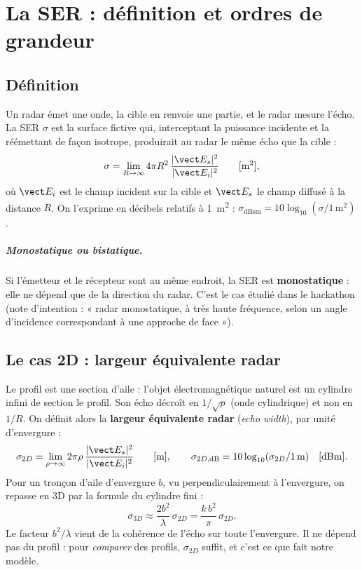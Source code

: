 \chapter{La SER : définition et ordres de grandeur}\label{ch:intro}

\section{Définition}
Un radar émet une onde, la cible en renvoie une partie, et le radar mesure l'écho. La SER $\sigma$ est la surface fictive qui, interceptant la puissance incidente et la réémettant de façon isotrope, produirait au radar le même écho que la cible :
\[
\sigma=\lim_{R\to\infty}4\pi R^2\,\frac{|\vect E_s|^2}{|\vect E_i|^2}\qquad[\mathrm{m}^2],
\]
où $\vect E_i$ est le champ incident sur la cible et $\vect E_s$ le champ diffusé à la distance $R$. On l'exprime en décibels relatifs à 1~m\textsuperscript{2} : $\sigma_{\mathrm{dBsm}}=10\log_{10}(\sigma/1\,\mathrm{m}^2)$.

\paragraph{Monostatique ou bistatique.} Si l'émetteur et le récepteur sont au même endroit, la SER est \textbf{monostatique} : elle ne dépend que de la direction du radar. C'est le cas étudié dans le hackathon (note d'intention : « radar monostatique, à très haute fréquence, selon un angle d'incidence correspondant à une approche de face »).

\section{Le cas 2D : largeur équivalente radar}
Le profil est une section d'aile : l'objet électromagnétique naturel est un cylindre infini de section le profil. Son écho décroît en $1/\sqrt\rho$ (onde cylindrique) et non en $1/R$. On définit alors la \textbf{largeur équivalente radar} (\emph{echo width}), par unité d'envergure :
\[
\sigma_{2D}=\lim_{\rho\to\infty}2\pi\rho\,\frac{|\vect E_s|^2}{|\vect E_i|^2}\qquad[\mathrm{m}],\qquad
\sigma_{2D,\mathrm{dB}}=10\log_{10}(\sigma_{2D}/1\,\mathrm{m})\quad[\mathrm{dBm}].
\]
Pour un tronçon d'aile d'envergure $b$, vu perpendiculairement à l'envergure, on repasse en 3D par la formule du cylindre fini :
\[
\sigma_{3D}\approx\frac{2b^2}{\lambda}\,\sigma_{2D}=\frac{k\,b^2}{\pi}\,\sigma_{2D}.
\]
Le facteur $b^2/\lambda$ vient de la cohérence de l'écho sur toute l'envergure. Il ne dépend pas du profil : pour \emph{comparer} des profils, $\sigma_{2D}$ suffit, et c'est ce que fait notre modèle.

